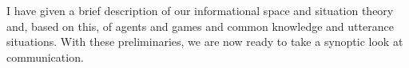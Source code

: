I have given a brief description of our informational space and situation theory and, based on this, of agents and games and common knowledge and utterance situations. With these preliminaries, we are now ready to take a synoptic look at communication.





